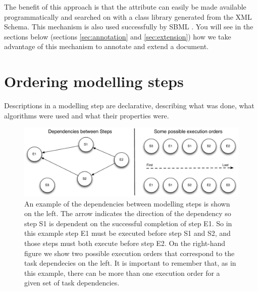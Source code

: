 The benefit of this approach is that the  attribute can
easily be made available programmatically and searched on with a class
library generated from the XML Schema.
This mechanism is also used successfully by SBML \cite[Section
6]{sbmll3v1c}. You will see in the sections below (sections \ref{sec:annotation} and
\ref{sec:extension}) how we take advantage of this mechanism to
annotate and extend a \pharmml document.

\section{Ordering modelling steps}

Descriptions in a modelling step are declarative, describing what
was done, what algorithms were used and what their properties were.

\begin{figure}[htb]
 \centering
  \includegraphics[width=1\linewidth]{Figures/ModellingStepDeps}
  \caption{An example of the dependencies between modelling steps is
    shown on the left. The arrow indicates the direction of the
    dependency so step S1 is dependent on the successful completion of
    step E1. So in this example step E1 must be executed before step
    S1 and S2, and those steps must both execute before step E2. On
    the right-hand figure we show two possible execution orders that
    correspond to the task dependecies on the left. It is important to
    remember that, as in this example, there can be more than one
    execution order for a given set of task dependencies.}
  \label{fig:modellingstep_deps}
\end{figure}

